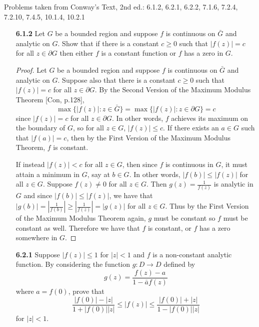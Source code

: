 \documentclass[11pt,oneside,english]{amsart}
\theoremstyle{definition}
\newcommand{\lspace}{\vspace{5mm}}
\begin{document}
\rightline{\today}

\lspace

Problems taken from Conway's Text, 2nd ed.: 6.1.2, 6.2.1, 6.2.2, 7.1.6, 7.2.4, 7.2.10, 7.4.5, 10.1.4, 10.2.1

\lspace

\begin{enumerate}[leftmargin=*]
\itemsep5mm

\item[\textbf{6.1.2}] Let $G$ be a bounded region and suppose $f$ is continuous on $\bar G$ and analytic on $G$. Show that if there is a constant $c\geq 0$ such that $|f(z)|=c$ for all $z\in\partial G$ then either $f$ is a constant function or $f$ has a zero in $G$.

\begin{proof}
Let $G$ be a bounded region and suppose $f$ is continuous on $\bar G$ and analytic on $G$. Suppose also that there is a constant $c\geq 0$ such that $|f(z)|=c$ for all $z\in\partial G$. By the Second Version of the Maximum Modulus Theorem [Con, p.128],
\[
\max\{|f(z)|:z\in \bar G\}=\max\{|f(z)|:z\in \partial G\}=c
\]
since $|f(z)|=c$ for all $z\in\partial G$. In other words, $f$ achieves its maximum on the boundary of $G$, so for all $z\in G$, $|f(z)|\leq c$. If there exists an $a\in G$ such that $|f(a)|=c$, then by the First Version of the Maximum Modulus Theorem, $f$ is constant.

If instead $|f(z)|<c$ for all $z\in G$, then since $f$ is continuous in $G$, it must attain a minimum in $G$, say at $b\in G$. In other words, $|f(b)|\leq |f(z)|$ for all $z\in G$. Suppose $f(z)\neq 0$ for all $z\in G$. Then $g(z)=\frac{1}{f(z)}$ is analytic in $G$ and since $|f(b)|\leq |f(z)|$, we have that $|g(b)|=\left|\frac{1}{f(b)}\right|\geq \left|\frac{1}{f(z)}\right|=|g(z)|$ for all $z\in G$. Thus by the First Version of the Maximum Modulus Theorem again, $g$ must be constant so $f$ must be constant as well. Therefore we have that $f$ is constant, or $f$ has a zero somewhere in $G$.
\end{proof}

\pagebreak

\item[\textbf{6.2.1}] Suppose $|f(z)|\leq 1$ for $|z|<1$ and $f$ is a non-constant analytic function. By considering the function $g:D\to D$ defined by
\[
g(z)=\frac{f(z)-a}{1-\bar af(z)}
\]
where $a=f(0)$, prove that
\[
\frac{|f(0)|-|z|}{1+|f(0)||z|}\leq |f(z)|\leq \frac{|f(0)|+|z|}{1-|f(0)||z|}
\]
for $|z|<1$.


\end{enumerate}
\end{document}
